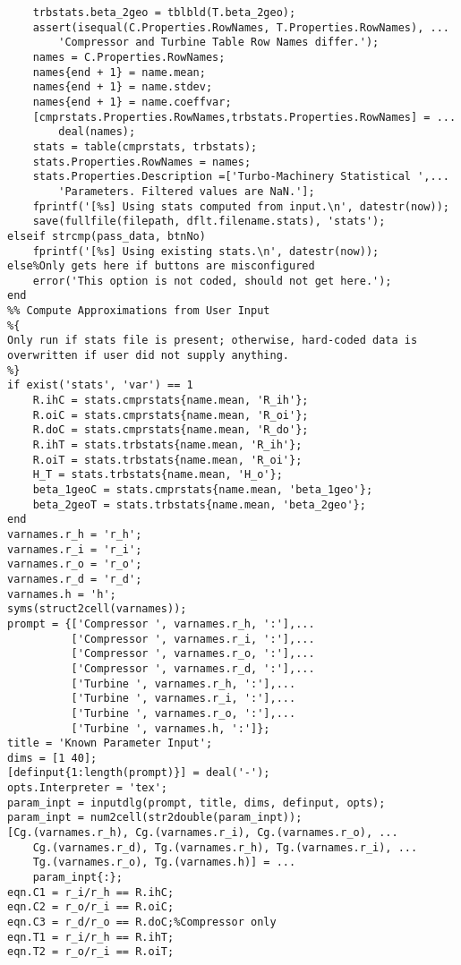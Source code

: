 \begin{lstlisting}
    trbstats.beta_2geo = tblbld(T.beta_2geo);    
    assert(isequal(C.Properties.RowNames, T.Properties.RowNames), ...
        'Compressor and Turbine Table Row Names differ.');
    names = C.Properties.RowNames;
    names{end + 1} = name.mean;
    names{end + 1} = name.stdev;
    names{end + 1} = name.coeffvar;    
    [cmprstats.Properties.RowNames,trbstats.Properties.RowNames] = ...
        deal(names);    
    stats = table(cmprstats, trbstats);    
    stats.Properties.RowNames = names;    
    stats.Properties.Description =['Turbo-Machinery Statistical ',...
        'Parameters. Filtered values are NaN.'];
    fprintf('[%s] Using stats computed from input.\n', datestr(now));    
    save(fullfile(filepath, dflt.filename.stats), 'stats');
elseif strcmp(pass_data, btnNo)
    fprintf('[%s] Using existing stats.\n', datestr(now));
else%Only gets here if buttons are misconfigured
    error('This option is not coded, should not get here.');
end
%% Compute Approximations from User Input
%{
Only run if stats file is present; otherwise, hard-coded data is
overwritten if user did not supply anything.
%}
if exist('stats', 'var') == 1
    R.ihC = stats.cmprstats{name.mean, 'R_ih'};
    R.oiC = stats.cmprstats{name.mean, 'R_oi'};
    R.doC = stats.cmprstats{name.mean, 'R_do'};
    R.ihT = stats.trbstats{name.mean, 'R_ih'};
    R.oiT = stats.trbstats{name.mean, 'R_oi'};
    H_T = stats.trbstats{name.mean, 'H_o'};
    beta_1geoC = stats.cmprstats{name.mean, 'beta_1geo'};
    beta_2geoT = stats.trbstats{name.mean, 'beta_2geo'};
end
varnames.r_h = 'r_h';
varnames.r_i = 'r_i';
varnames.r_o = 'r_o';
varnames.r_d = 'r_d';
varnames.h = 'h';
syms(struct2cell(varnames));
prompt = {['Compressor ', varnames.r_h, ':'],...
          ['Compressor ', varnames.r_i, ':'],...
          ['Compressor ', varnames.r_o, ':'],...
          ['Compressor ', varnames.r_d, ':'],...
          ['Turbine ', varnames.r_h, ':'],...
          ['Turbine ', varnames.r_i, ':'],...
          ['Turbine ', varnames.r_o, ':'],...
          ['Turbine ', varnames.h, ':']};
title = 'Known Parameter Input';
dims = [1 40];
[definput{1:length(prompt)}] = deal('-');
opts.Interpreter = 'tex';
param_inpt = inputdlg(prompt, title, dims, definput, opts);
param_inpt = num2cell(str2double(param_inpt));
[Cg.(varnames.r_h), Cg.(varnames.r_i), Cg.(varnames.r_o), ...
    Cg.(varnames.r_d), Tg.(varnames.r_h), Tg.(varnames.r_i), ...
    Tg.(varnames.r_o), Tg.(varnames.h)] = ...
    param_inpt{:};
eqn.C1 = r_i/r_h == R.ihC;
eqn.C2 = r_o/r_i == R.oiC;
eqn.C3 = r_d/r_o == R.doC;%Compressor only
eqn.T1 = r_i/r_h == R.ihT;
eqn.T2 = r_o/r_i == R.oiT;

\end{lstlisting}
